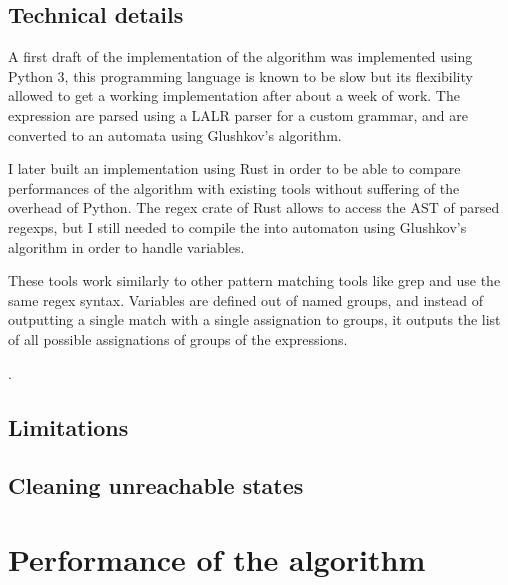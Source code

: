\documentclass[12px]{article}
\theoremstyle{definition}
\begin{document}

    \subsection{Technical details}


      A first draft of the implementation of the algorithm was implemented
      using Python 3, this programming language is known to be slow but its
      flexibility allowed to get a working implementation after about a week of
      work. The expression are parsed using a LALR parser for a custom grammar,
      and are converted to an automata using Glushkov's algorithm.

      I later built an implementation using Rust in order to be able to compare
      performances of the algorithm with existing tools without suffering of
      the overhead of Python. The regex crate of Rust allows to access the
      AST of parsed regexps, but I still needed to compile the into automaton
      using Glushkov's algorithm in order to handle variables.

      These tools work similarly to other pattern matching tools like grep and
      use the same regex syntax. Variables are defined out of named groups, and
      instead of outputting a single match with a single assignation to groups,
      it outputs the list of all possible assignations of groups of the
      expressions.

      .

    \subsection{Limitations}


    \subsection{Cleaning unreachable states}


  \section{Performance of the algorithm}
\end{document}
